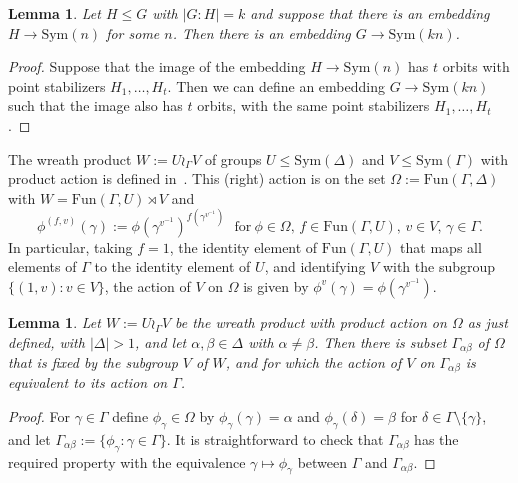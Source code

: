 \documentclass[12pt,a4paper]{article}
\newcommand{\Sym}{\mathrm{Sym}}
\newcommand{\Fun}{\mathrm{Fun}}
\newtheorem{lemma}[theorem]{Lemma} %
\begin{document}
\begin{lemma}\label{lem:subembed}
Let $H \le G$ with $|G:H|=k$ and suppose that there is an embedding
$H \to \Sym(n)$ for some $n$. Then there is an embedding $G \to \Sym(kn)$.
\end{lemma}
\begin{proof}
Suppose that the image of the embedding $H \to \Sym(n)$ has $t$ orbits with
point stabilizers $H_1,\ldots,H_t$. Then we can define an embedding
$G \to \Sym(kn)$ such that the image also has $t$ orbits, with the same
point stabilizers $H_1,\ldots,H_t$.
\end{proof}

The wreath product $W := U \wr_\Gamma V$ of groups
$U \le \Sym(\Delta)$ and $V \le \Sym(\Gamma)$ with product action is defined
in~\cite[Section 2.1]{DM}. This (right) action is on the set
$\Omega := \Fun(\Gamma,\Delta)$ with $W = \Fun(\Gamma,U) \rtimes V$ and
$$\phi^{(f,v)}(\gamma) := \phi(\gamma^{v^{-1}})^{f(\gamma^{v^{-1}})}
\ \ \ \mathrm{for}\ \phi \in \Omega,\,f \in \Fun(\Gamma,U),\,v \in V,\,
\gamma \in \Gamma.
$$
In particular, taking $f=1$, the identity element of $\Fun(\Gamma,U)$ that
maps all elements of $\Gamma$ to the identity element of $U$, and
identifying $V$ with the subgroup $\{(1,v): v \in V\}$, the action of $V$
on $\Omega$ is given by $\phi^v(\gamma) = \phi(\gamma^{v^{-1}})$.

\begin{lemma}\label{lem:prodactorb}
Let $W := U \wr_\Gamma V$ be the wreath product with product
action on $\Omega$ as just defined, with $|\Delta|>1$, and let
$\alpha,\beta \in \Delta$ with $\alpha \ne \beta$. Then there is subset
$\Gamma_{\alpha\beta}$ of $\Omega$ that is fixed by the subgroup $V$ of $W$,
and for which the action of $V$ on $\Gamma_{\alpha\beta}$ is equivalent to its
action on $\Gamma$.
\end{lemma}
\begin{proof} For $\gamma \in \Gamma$ define $\phi_\gamma \in \Omega$
by $\phi_\gamma(\gamma)=\alpha$ and $ \phi_\gamma(\delta)=\beta$ for
$\delta \in \Gamma \setminus \{\gamma\}$, and let
$\Gamma_{\alpha\beta} := \{ \phi_\gamma : \gamma \in \Gamma \}$.
It is straightforward to check that $\Gamma_{\alpha\beta}$ has the required
property with the equivalence $\gamma \mapsto \phi_\gamma$ between
$\Gamma$ and $\Gamma_{\alpha\beta}$.
\end{proof}
\end{document}
